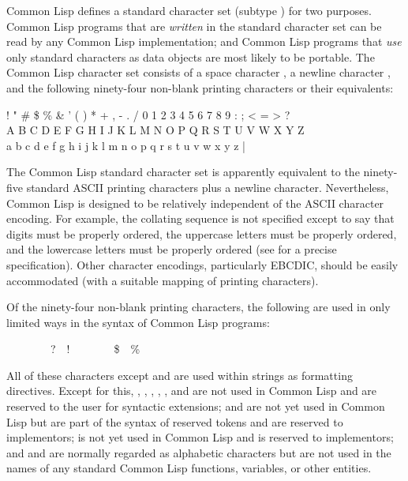 {Common Lisp defines a standard character set (subtype )
for two purposes.
Common Lisp programs that are {\it written} in the standard character set
can be read by any Common Lisp implementation; and Common Lisp programs
that {\it use} only standard characters as data objects are most likely
to be portable.  The Common Lisp character set consists of a space character
, a newline character , and the
following ninety-four
non-blank printing characters or their equivalents:
\begin{lisp}
! " \# \$ \% \& ' ( ) * + , - . / 0 1 2 3 4 5 6 7 8 9 : ; < = > ? \\
{\Xatsign} A B C D E F G H I J K L M N O P Q R S T U V W X Y Z {\Xlbracket} {\Xbackslash} {\Xrbracket} {\Xcircumflex} {\Xunderscore} \\
{\Xbq} a b c d e f g h i j k l m n o p q r s t u v w x y z {\Xlbrace} | {\Xrbrace} {\Xtilde}
\end{lisp}
The Common Lisp standard character set is apparently equivalent to
the ninety-five standard ASCII printing characters plus a newline character.
Nevertheless, Common Lisp is designed to be relatively independent of
the ASCII character encoding.  For example, the collating sequence
is not specified except to say that digits must be properly ordered,
the uppercase letters must be properly ordered, and
the lowercase letters must be properly ordered
(see  for a precise specification).
Other character encodings, particularly EBCDIC, should be easily accommodated
(with a suitable mapping of printing characters).

Of the ninety-four non-blank printing characters, the following are
used in only limited ways in the syntax of Common Lisp programs:
\begin{lisp}
{\Xlbracket}~~{\Xrbracket}~~{\Xlbrace}~~{\Xrbrace}~~?~~!~~{\Xcircumflex}~~{\Xunderscore}~~{\Xtilde}~~\$~~\% 
\end{lisp}
\begin{obsolete}
\noindent
All of these characters except \cd{!} and \cd{{\Xunderscore}} are used within
 strings as formatting directives.
Except for this,
\cd{{\Xlbracket}}, \cd{{\Xrbracket}}, \cd{{\Xlbrace}}, \cd{{\Xrbrace}},
, and \cd{!} are not used in Common Lisp and are reserved to the user
for syntactic extensions; \cd{{\Xcircumflex}} and \cd{{\Xunderscore}}
are not yet used in Common Lisp
but are part of the syntax of reserved tokens
and are reserved to implementors;
\cd{{\Xtilde}} is not yet used in Common Lisp and is reserved to implementors;
and \cd{\$} and \cd{\%} are normally regarded as alphabetic characters
but are not used in the names of any standard Common Lisp functions,
variables, or other entities.
\end{obsolete}

}
